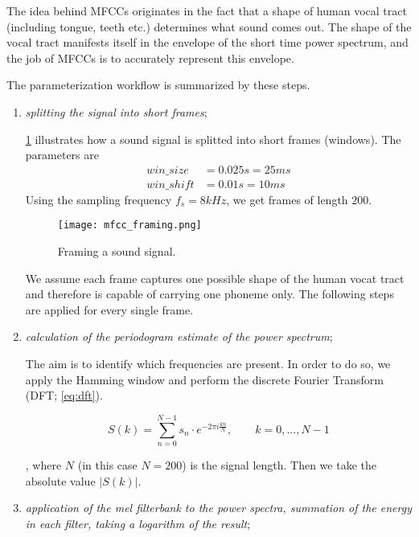 The idea behind MFCCs originates in the fact that a shape of human vocal tract (including tongue, teeth etc.) determines what sound comes out. The shape of the vocal tract manifests itself in the envelope of the short time power spectrum, and the job of MFCCs is to accurately represent this envelope.

The parameterization workflow is summarized by these steps.

\begin{enumerate}
\item \textit{splitting the signal into short frames};

\cref{fig:methods:mfcc_framing} illustrates how a sound signal is splitted into short frames (windows). The parameters are
\begin{align*}
win\_size &= 0.025 s = 25 ms \\
win\_shift &= 0.01 s = 10 ms
\end{align*}
Using the sampling frequency $ f_s = 8 kHz $, we get frames of length $ 200 $.

\begin{figure}[H]
\centering
\texttt{[image: mfcc\_framing.png]}
\caption{Framing a sound signal.}
\label{fig:methods:mfcc_framing}
\end{figure}

We assume each frame captures one possible shape of the human vocat tract and therefore is capable of carrying one phoneme only. The following steps are applied for every single frame.

\item \textit{calculation of the periodogram estimate of the power spectrum}; 

The aim is to identify which frequencies are present. In order to do so, we apply the Hamming window and perform the discrete Fourier Transform (DFT; \cref{eq:dft}).

\begin{equation} \label{eq:dft}
S(k) = \displaystyle\sum_{n=0}^{N-1} s_n \cdot e^{-2 \pi i \frac{kn}{N}}, \qquad k = 0, ..., N-1
\end{equation}

, where $ N $ (in this case $ N = 200 $) is the signal length. Then we take the absolute value $ |S(k)| $.

\item \textit{application of the mel filterbank to the power spectra, summation of the energy in each filter, taking a logarithm of the result};


\end{enumerate}
